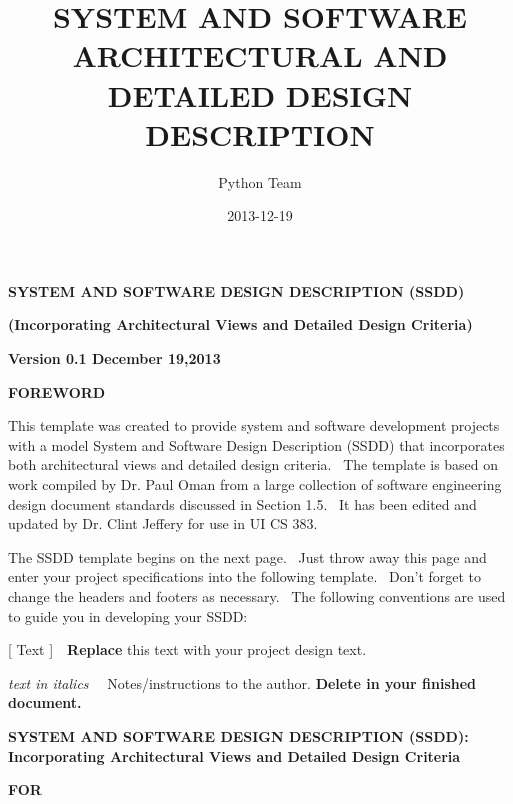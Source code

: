 \documentclass[twoside,letterpaper]{article}
\title{SYSTEM AND SOFTWARE ARCHITECTURAL AND DETAILED DESIGN DESCRIPTION}
\author{Python Team}
\date{2013-12-19}
\begin{document}
\clearpage\setcounter{page}{1}\pagestyle{Standard}
\thispagestyle{FirstPage}
{\centering{}\bfseries\color{black}
SYSTEM AND SOFTWARE\newline
DESIGN DESCRIPTION (SSDD)
\par}

{\centering{}\bfseries\color{black}
(Incorporating Architectural Views and Detailed Design Criteria)
\par}

{\centering{}\bfseries\color{black}
Version 0.1
\newline
December 19,2013
\par}

{\centering{}\bfseries\color{black}
FOREWORD
\par}

{\color{black}
This template was created to provide system and software development
projects with a model System and Software Design Description (SSDD)
that incorporates both architectural views and detailed design
criteria. \ The template is based on work compiled by Dr. Paul Oman
from a large collection of software engineering design document
standards discussed in Section 1.5. \ It has been edited and updated by
Dr. Clint Jeffery for use in UI CS 383.}

{\color{black}
The SSDD template begins on the next page. \ Just throw away this page
and enter your project specifications into the following template.
\ Don{\textquoteright}t forget to change the headers and footers as
necessary. \ The following conventions are used to guide you in
developing your SSDD:}

{\color{black}
{[ Text
]\ \ }{\textbf{Replace}}{
this text with your project design text.}}

{\color{black}
{\textit{text
in italics }}{\ \ Notes/instructions to the
author. }{\textbf{Delete in your finished
document.}}}


\bigskip

\clearpage

{\centering{}\bfseries\color{black}
SYSTEM AND SOFTWARE DESIGN DESCRIPTION (SSDD): Incorporating
Architectural Views and Detailed Design Criteria
\par}

{\centering{}\bfseries\color{black}
FOR
\par}
\end{document}
